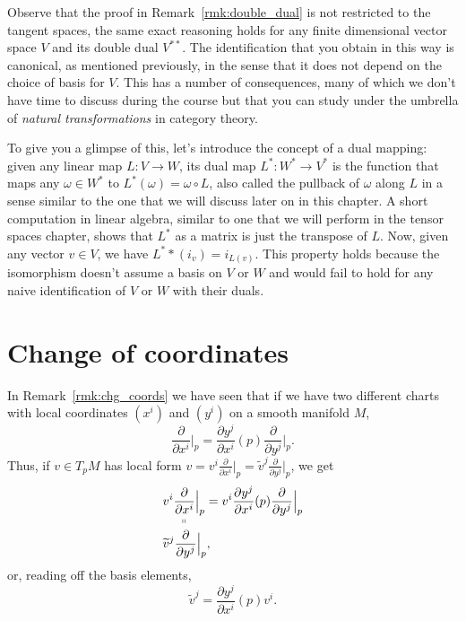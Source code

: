 \begin{remark}
	Observe that the proof in Remark~\ref{rmk:double_dual} is not restricted to the tangent spaces, the same exact reasoning holds for any finite dimensional vector space $V$ and its double dual $V^{**}$.
	The identification that you obtain in this way is canonical, as mentioned previously, in the sense that it does not depend on the choice of basis for $V$. This has a number of consequences, many of which we don't have time to discuss during the course but that you can study under the umbrella of \emph{natural transformations} in category theory.

	To give you a glimpse of this, let's introduce the concept of a dual mapping: given any linear map $L:V\to W$, its dual map $L^* : W^* \to V^*$ is the function that maps any $\omega\in W^*$ to $L^*(\omega) = \omega \circ L$, also called the pullback of $\omega$ along $L$ in a sense similar to the one that we will discuss later on in this chapter. A short computation in linear algebra, similar to one that we will perform in the tensor spaces chapter, shows that $L^*$ as a matrix is just the transpose of $L$. Now, given any vector $v\in V$, we have $L^**(i_v)=i_{L(v)}$. This property holds because the isomorphism doesn't assume a basis on $V$ or $W$ and would fail to hold for any naive identification of $V$ or $W$ with their duals.
\end{remark}

\section{Change of coordinates}
In Remark~\ref{rmk:chg_coords} we have seen that if we have two different charts with local coordinates $(x^i)$ and $(y^i)$ on a smooth manifold $M$,
\begin{equation}
	\frac{\partial}{\partial x^i}\Big|_p = \frac{\partial y^j}{\partial x^i}(p) \frac{\partial}{\partial y^j}\Big|_p.
\end{equation}
Thus, if $v\in T_pM$ has local form $v = v^i \frac{\partial}{\partial x^i}\big|_p = \widetilde v^j \frac{\partial}{\partial y^j}\big|_p$, we get
\begin{align}
	 & \underset{\shortparallel}{v^i \frac{\partial}{\partial x^i}\Big|_p} = v^i \frac{\partial y^j}{\partial x^i}(p) \frac{\partial}{\partial y^j}\Big|_p \\
	 & \widetilde v^j \frac{\partial}{\partial y^j}\Big|_p,
\end{align}
or, reading off the basis elements,
\begin{equation}\label{eq:contravariant}
	\widetilde v^j = \frac{\partial y^j}{\partial x^i}(p) v^i.
\end{equation}

